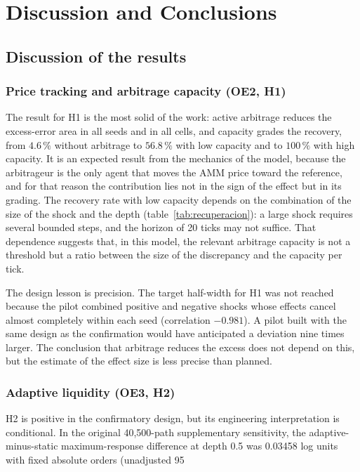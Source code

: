 \chapter{Discussion and Conclusions}
\label{cap:discusion}

\section{Discussion of the results}

\subsection{Price tracking and arbitrage capacity (OE2, H1)}

The result for H1 is the most solid of the work: active arbitrage reduces the excess-error area in all seeds and in all cells, and capacity grades the recovery, from $4.6\,\%$ without arbitrage to $56.8\,\%$ with low capacity and to $100\,\%$ with high capacity. It is an expected result from the mechanics of the model, because the arbitrageur is the only agent that moves the AMM price toward the reference, and for that reason the contribution lies not in the sign of the effect but in its grading. The recovery rate with low capacity depends on the combination of the size of the shock and the depth (table~\ref{tab:recuperacion}): a large shock requires several bounded steps, and the horizon of 20 ticks may not suffice. That dependence suggests that, in this model, the relevant arbitrage capacity is not a threshold but a ratio between the size of the discrepancy and the capacity per tick.

The design lesson is precision. The target half-width for H1 was not reached because the pilot combined positive and negative shocks whose effects cancel almost completely within each seed (correlation $-0.981$). A pilot built with the same design as the confirmation would have anticipated a deviation nine times larger. The conclusion that arbitrage reduces the excess does not depend on this, but the estimate of the effect size is less precise than planned.

\subsection{Adaptive liquidity (OE3, H2)}

H2 is positive in the confirmatory design, but its engineering interpretation is conditional. In the original 40,500-path supplementary sensitivity, the adaptive-minus-static maximum-response difference at depth 0.5 was 0.03458 log units with fixed absolute orders (unadjusted 95%

